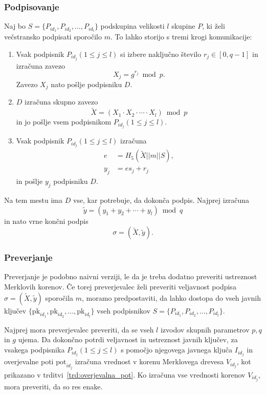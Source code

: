 \documentclass[isrm2, tisk]{fmfdelo}
\begin{document}
\subsubsection{Podpisovanje}
Naj bo $S = \{P_{id_1}, P_{id_2}, \dots, P_{id_l}\}$ podskupina velikosti $l$ skupine $P$, ki želi
večstransko podpisati sporočilo $m$. To lahko storijo s tremi krogi komunikacije:
\begin{enumerate}
    \item Vsak podpisnik $P_{id_j} (1 \le j \le l)$ si izbere naključno število $r_j \in [0, q - 1]$ 
        in izračuna zavezo
        $$ 
        X_j = g^{r_j} \bmod p.
        $$
        Zavezo $X_j$ nato pošlje podpisniku $D$.
    \item $D$ izračuna skupno zavezo
        $$ 
        \tilde{X} = (X_1 \cdot X_2 \cdot \cdots \cdot X_l) \bmod p
        $$
        in jo pošlje vsem podpisnikom $P_{id_j} (1 \le j \le l)$.
    \item Vsak podpisnik $P_{id_j} (1 \le j \le l)$ izračuna
        \begin{align*}
            e &= H_5(\tilde{X} || m || S), \\
            y_j &= e s_j + r_j
        \end{align*}
        in pošlje $y_j$ podpisniku $D$.
\end{enumerate}
Na tem mestu ima $D$ vse, kar potrebuje, da dokonča podpis. Najprej izračuna
$$
\tilde{y} = (y_1 + y_2 + \cdots + y_l) \bmod q
$$
in nato vrne končni podpis
$$
\sigma = (\tilde{X}, \tilde{y}).
$$

\subsubsection{Preverjanje}
Preverjanje je podobno naivni verziji, le da je treba dodatno preveriti ustreznost Merklovih
korenov. Če torej preverjevalec želi preveriti veljavnost podpisa $\sigma = (\tilde{X}, \tilde{y})$
sporočila $m$, moramo predpostaviti, da lahko dostopa do vseh javnih ključev $\{\text{pk}_{id_1},
\text{pk}_{id_2}, \dots, \text{pk}_{id_l}\}$ vseh podpisnikov $S = \{P_{id_1}, P_{id_2}, \dots, 
P_{id_l}\}$.

Najprej mora preverjevalec preveriti, da se vseh $l$ izvodov skupnih parametrov $p, q$ in $g$ ujema.
Da dokončno potrdi veljavnost in ustreznost javnih ključev, za vsakega podpisnika $P_{id_j} (1 \le
j \le l)$ s pomočjo njegovega javnega ključa $I_{id_j}$ in overjevalne poti $\text{pot}_{id_j}$
izračuna vrednost v korenu Merklovega drevesa $V_{id_j}$, kot prikazano v trditvi~\ref{trd:overjevalna_pot}.
Ko izračuna vse vrednosti korenov $V_{id_j}$, mora preveriti, da so res enake. 
\end{document}
